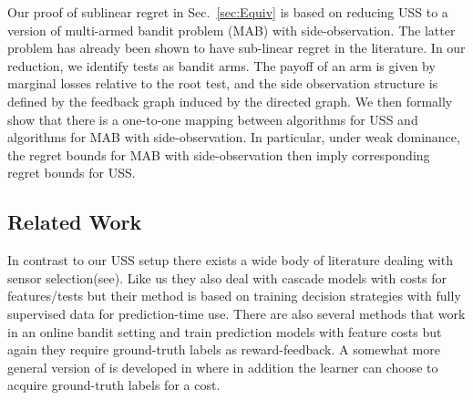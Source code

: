 \documentclass[11pt]{article} %
\newcommand{\todoc}[2][]{\todo[color=Apricot!20,size=\tiny,#1]{Cs: #2}}
\newcommand{\ses}{sensor selection\xspace}
\begin{document}
Our proof of sublinear regret in Sec.~\ref{sec:Equiv} is based on reducing USS to a version of multi-armed bandit problem (MAB) with side-observation. The latter problem has already been shown to have sub-linear regret in the literature. In our reduction, we identify tests as bandit arms. %
The payoff of an arm is given by marginal losses relative to the root test, and the side observation structure is defined by the feedback graph induced by the directed graph. We then formally show that there is a one-to-one mapping between algorithms for USS and algorithms for MAB with side-observation. In particular, under weak dominance, the regret bounds for MAB with side-observation then imply corresponding regret bounds for USS.

\subsection{Related Work}
%
%
In contrast to our USS setup there exists a wide body of literature dealing with \ses (see\cite{AISTATS13_SupervisedSequentialLearning_TrapezSaligram,NIPS2015_DirectedAcyclic_WangTrapezSaligram,ICML2015_FeatureBudgeted_NanWangSaligrama}). Like us they also deal with cascade models with costs for features/tests but their method is based on training decision strategies with fully supervised data for prediction-time use. There are also several methods that work in an online bandit setting and train prediction models with feature costs \cite{SBCA14:BanditsPaid} but again they require ground-truth labels as reward-feedback. A somewhat more general version of \cite{SBCA14:BanditsPaid} is developed in \cite{ZBGGySz13:CostlyFeatures} where in addition the learner can choose to acquire ground-truth labels for a cost.

%
\end{document}
